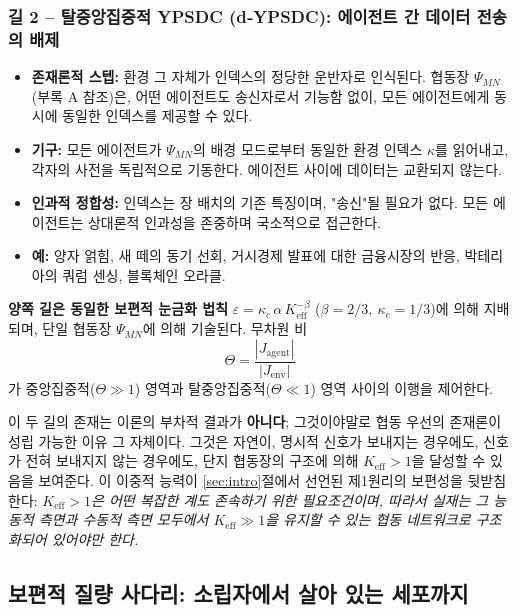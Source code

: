 \documentclass[12pt,a4paper]{article}
\begin{document}
	\subsubsection*{길 2 – 탈중앙집중적 YPSDC (d‑YPSDC): 에이전트 간 데이터 전송의 배제}
	\begin{itemize}[leftmargin=*]
		\item \textbf{존재론적 스텝:} 환경 그 자체가 인덱스의 정당한 운반자로 인식된다. 협동장 \(\Psi_{MN}\)(부록 A 참조)은, 어떤 에이전트도 송신자로서 기능함 없이, 모든 에이전트에게 동시에 동일한 인덱스를 제공할 수 있다.
		\item \textbf{기구:} 모든 에이전트가 \(\Psi_{MN}\)의 배경 모드로부터 동일한 환경 인덱스 \(\kappa\)를 읽어내고, 각자의 사전을 독립적으로 기동한다. 에이전트 사이에 데이터는 교환되지 않는다.
		\item \textbf{인과적 정합성:} 인덱스는 장 배치의 기존 특징이며, "송신"될 필요가 없다. 모든 에이전트는 상대론적 인과성을 존중하며 국소적으로 접근한다.
		\item \textbf{예:} 양자 얽힘, 새 떼의 동기 선회, 거시경제 발표에 대한 금융시장의 반응, 박테리아의 쿼럼 센싱, 블록체인 오라클.
	\end{itemize}
	
	\medskip
	\noindent
	\textbf{양쪽 길은 동일한 보편적 눈금화 법칙} \(\varepsilon = \kappa_c\,\alpha\,K_{\mathrm{eff}}^{-\beta}\) (\(\beta = 2/3,\ \kappa_c = 1/3\))에 의해 지배되며, 단일 협동장 \(\Psi_{MN}\)에 의해 기술된다. 무차원 비
	\[
	\Theta = \frac{|J_{\mathrm{agent}}|}{|J_{\mathrm{env}}|}
	\]
	가 중앙집중적(\(\Theta \gg 1\)) 영역과 탈중앙집중적(\(\Theta \ll 1\)) 영역 사이의 이행을 제어한다.
	
	이 두 길의 존재는 이론의 부차적 결과가 \textbf{아니다}; 그것이야말로 협동 우선의 존재론이 성립 가능한 이유 그 자체이다. 그것은 자연이, 명시적 신호가 보내지는 경우에도, 신호가 전혀 보내지지 않는 경우에도, 단지 협동장의 구조에 의해 \(K_{\mathrm{eff}} > 1\)을 달성할 수 있음을 보여준다. 이 이중적 능력이 \ref{sec:intro}절에서 선언된 제1원리의 보편성을 뒷받침한다: \emph{\(K_{\mathrm{eff}} > 1\)은 어떤 복잡한 계도 존속하기 위한 필요조건이며, 따라서 실재는 그 능동적 측면과 수동적 측면 모두에서 \(K_{\mathrm{eff}} \gg 1\)을 유지할 수 있는 협동 네트워크로 구조화되어 있어야만 한다.}
	
	\subsection{보편적 질량 사다리: 소립자에서 살아 있는 세포까지}
	\label{subsec:universal-ladder}
	
\end{document}
